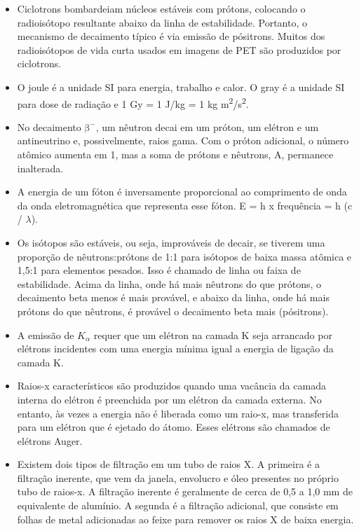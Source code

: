 \documentclass[11pt,a4paper]{article}
\newcounter{exemplo}
\begin{document}
\begin{exemplo}[Física]
\begin{itemize}
        \item Ciclotrons bombardeiam núcleos estáveis com prótons, colocando o radioisótopo resultante abaixo da linha de estabilidade. Portanto, o mecanismo de decaimento típico é via emissão de pósitrons. Muitos dos radioisótopos de vida curta usados em imagens de PET são produzidos por ciclotrons.
        
        \item O joule é a unidade SI para energia, trabalho e calor. O gray é a unidade SI para dose de radiação e 1 Gy = 1 J/kg = 1 kg m\textsuperscript{2}/s\textsuperscript{2}.
        
        \item No decaimento $\mathrm{\beta}^-$, um nêutron decai em um próton, um elétron e um antineutrino e, possivelmente, raios gama. Com o próton adicional, o número atômico aumenta em 1, mas a soma de prótons e nêutrons, A, permanece inalterada.
        
        \item A energia de um fóton é inversamente proporcional ao comprimento de onda da onda eletromagnética que representa esse fóton. E = h x frequência = h (c / $\lambda$).
        
        \item Os isótopos são estáveis, ou seja, improváveis de decair, se tiverem uma proporção de nêutrons:prótons de 1:1 para isótopos de baixa massa atômica e 1,5:1 para elementos pesados. Isso é chamado de linha ou faixa de estabilidade. Acima da linha, onde há mais nêutrons do que prótons, o decaimento beta menos é mais provável, e abaixo da linha, onde há mais prótons do que nêutrons, é provável o decaimento beta mais (pósitrons).
        
        \item A emissão de $K_\alpha$ requer que um elétron na camada K seja arrancado por elétrons incidentes com uma energia mínima igual a energia de ligação da camada K.
        
        \item Raios-x característicos são produzidos quando uma vacância da camada interna do elétron é preenchida por um elétron da camada externa. No entanto, às vezes a energia não é liberada como um raio-x, mas transferida para um elétron que é ejetado do átomo. Esses elétrons são chamados de elétrons Auger.
        
        \item Existem dois tipos de filtração em um tubo de raios X. A primeira é a filtração inerente, que vem da janela, envolucro e óleo presentes no próprio tubo de raios-x. A filtração inerente é geralmente de cerca de 0,5 a 1,0 mm de equivalente de alumínio. A segunda é a filtração adicional, que consiste em folhas de metal adicionadas ao feixe para remover os raios X de baixa energia.
        

\end{itemize}
\end{exemplo}
\end{document}
